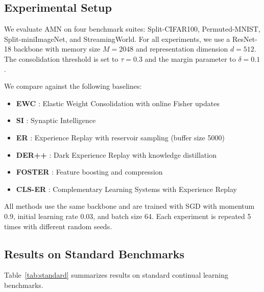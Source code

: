\documentclass[11pt]{article}
\begin{document}
\subsection{Experimental Setup}

We evaluate AMN on four benchmark suites: Split-CIFAR100, Permuted-MNIST, Split-miniImageNet, and StreamingWorld. For all experiments, we use a ResNet-18 backbone with memory size $M = 2048$ and representation dimension $d = 512$. The consolidation threshold is set to $\tau = 0.3$ and the margin parameter to $\delta = 0.1$.

We compare against the following baselines:
\begin{itemize}
    \item \textbf{EWC} \citep{kirkpatrick2017overcoming}: Elastic Weight Consolidation with online Fisher updates
    \item \textbf{SI} \citep{zenke2017continual}: Synaptic Intelligence
    \item \textbf{ER} \citep{rolnick2019experience}: Experience Replay with reservoir sampling (buffer size 5000)
    \item \textbf{DER++} \citep{buzzega2020dark}: Dark Experience Replay with knowledge distillation
    \item \textbf{FOSTER} \citep{wang2022foster}: Feature boosting and compression
    \item \textbf{CLS-ER} \citep{arani2022learning}: Complementary Learning Systems with Experience Replay
\end{itemize}

All methods use the same backbone and are trained with SGD with momentum 0.9, initial learning rate 0.03, and batch size 64. Each experiment is repeated 5 times with different random seeds.

\subsection{Results on Standard Benchmarks}

Table~\ref{tab:standard} summarizes results on standard continual learning benchmarks.
\end{document}
